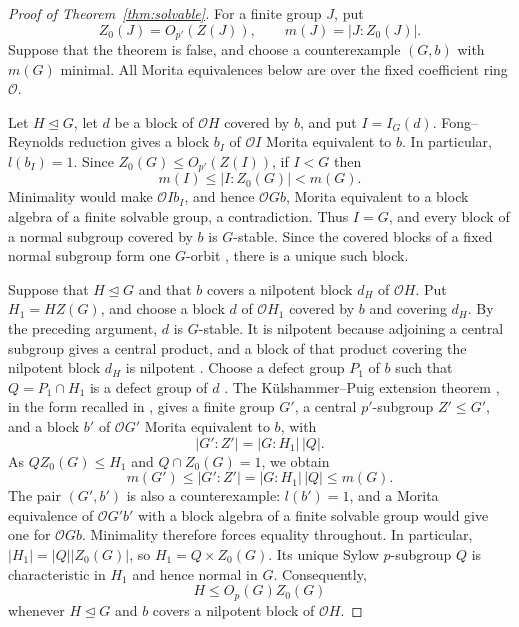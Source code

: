 \documentclass[11pt,a4paper]{article}
\theoremstyle{definition}
\theoremstyle{remark}
\numberwithin{equation}{section}
\newcommand{\cO}{\mathcal{O}}
\begin{document}
	\begin{proof}[Proof of Theorem~\ref{thm:solvable}]
		For a finite group $J$, put
		\[
		Z_0(J)=O_{p'}(Z(J)),\qquad m(J)=|J:Z_0(J)|.
		\]
		Suppose that the theorem is false, and choose a counterexample
		$(G,b)$ with $m(G)$ minimal. All Morita equivalences below are
		over the fixed coefficient ring $\cO$.
		
		Let $H\unlhd G$, let $d$ be a block of $\cO H$ covered by $b$,
		and put $I=I_G(d)$. Fong--Reynolds reduction
		\cite[Theorem~6.8.3]{Linckelmann2018b} gives a block $b_I$ of $\cO I$
		Morita equivalent to $b$. In particular, $l(b_I)=1$.
		Since $Z_0(G)\leq O_{p'}(Z(I))$, if $I<G$ then
		\[
		m(I)\leq |I:Z_0(G)|<m(G).
		\]
		Minimality would make $\cO Ib_I$, and hence $\cO Gb$,
		Morita equivalent to a block algebra of a finite solvable
		group, a contradiction. Thus $I=G$, and every block of a normal
		subgroup covered by $b$ is $G$-stable. Since the covered blocks of a fixed normal
		subgroup form one $G$-orbit \cite[Corollary~9.3]{Navarro1998}, there is a unique such block.
		
		Suppose that $H\unlhd G$ and that $b$ covers a nilpotent block
		$d_H$ of $\cO H$. Put $H_1=HZ(G)$, and choose a block $d$ of
		$\cO H_1$ covered by $b$ and covering $d_H$. By the preceding
		argument, $d$ is $G$-stable. It is nilpotent because adjoining a central
		subgroup gives a central product, and a block of that product
		covering the nilpotent block $d_H$ is nilpotent \cite[Lemma~7.5(iii)]{Sambale2014}.
		Choose a defect group $P_1$ of $b$ such that
		$Q=P_1\cap H_1$ is a defect group of $d$
		\cite[Theorem~9.26]{Navarro1998}.
		The K\"ulshammer--Puig extension theorem \cite[Theorems~1.8 and~1.12]{KulshammerPuig1990}, in the
		form recalled in \cite[Lemma~5.2]{JiangZhangZhou2026}, gives a finite group
		$G'$, a central $p'$-subgroup $Z'\leq G'$, and a block $b'$
		of $\cO G'$ Morita equivalent to $b$, with
		\[
		|G':Z'|=|G:H_1|\,|Q|.
		\]
		As $QZ_0(G)\leq H_1$ and $Q\cap Z_0(G)=1$, we obtain
		\[
		m(G')\leq |G':Z'|=|G:H_1|\,|Q|\leq m(G).
		\]
		The pair $(G',b')$ is also a counterexample: $l(b')=1$,
		and a Morita equivalence of $\cO G'b'$ with a block algebra
		of a finite solvable group would give one for $\cO Gb$.
		Minimality therefore forces equality throughout.
		In particular, $|H_1|=|Q||Z_0(G)|$, so
		$H_1=Q\times Z_0(G)$. Its unique Sylow $p$-subgroup $Q$
		is characteristic in $H_1$ and hence normal in $G$.
		Consequently,
		\begin{equation}\label{eq:nilpotent-normal-subgroup}
			H\leq O_p(G)Z_0(G)
		\end{equation}
		whenever $H\unlhd G$ and $b$ covers a nilpotent block of
		$\cO H$.
		

\end{proof}
\end{document}
